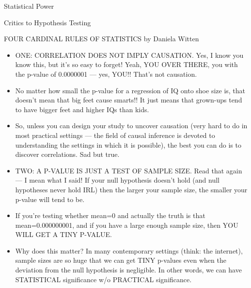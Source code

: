\documentclass[handout]{beamer}
\begin{document}
\begin{frame}{Statistical Power}
 
\end{frame}

\begin{frame}{Critics to Hypothesis Testing}
 
\end{frame}


\begin{frame}{FOUR CARDINAL RULES OF STATISTICS by Daniela Witten}
\scriptsize{
\begin{itemize}
 \item ONE:  CORRELATION DOES NOT IMPLY CAUSATION.  Yes, I know you know this, but it’s so easy to forget! Yeah, YOU OVER THERE, you with the p-value of 0.0000001 — yes, YOU!! That’s not causation.
 \item No matter how small the p-value for a regression of IQ onto shoe size is, that doesn’t mean that big feet cause smarts!!  It just means that grown-ups tend to have bigger feet and higher IQs than kids.
 \item So, unless you can design your study to uncover causation (very hard to do in most practical settings — the field of causal inference is devoted to understanding the settings in which it is possible), the best you can do is to discover correlations.  Sad but true.
 \item TWO:  A P-VALUE IS JUST A TEST OF SAMPLE SIZE.  Read that again — I mean what I said!  If your null hypothesis doesn't hold (and null hypotheses never hold IRL) then the larger your sample size, the smaller your p-value will tend to be.
 \item If you’re testing whether mean=0 and actually the truth is that mean=0.000000001, and if you have a large enough sample size, then YOU WILL GET A TINY P-VALUE.
 \item Why does this matter? In many contemporary settings (think: the internet), sample sizes are so huge that we can get TINY p-values even when the deviation from the null hypothesis is negligible. In other words, we can have STATISTICAL significance w/o PRACTICAL significance.
 \end{itemize}

} 
\end{frame}
\end{document}

